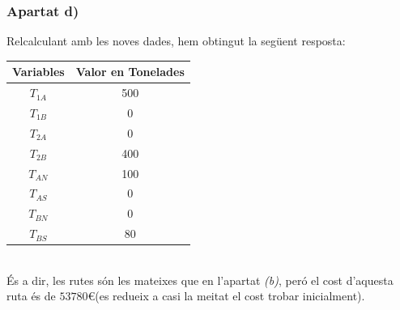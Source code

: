 \documentclass[a4paper, 11pt]{article}
\begin{document}
\subsubsection{Apartat d)}
Relcalculant amb les noves dades, hem obtingut la següent resposta:\\
\begin{table}[h]
    \centering
    \begin{tabular}{ c | c }
        \textbf{Variables} & \textbf{Valor en Tonelades} \\ \hline
        $T_{1A}$ & 500 \\ \hline
        $T_{1B}$ & 0 \\ \hline
        $T_{2A}$ & 0 \\ \hline
        $T_{2B}$ & 400 \\ \hline
        $T_{AN}$ & 100 \\ \hline
        $T_{AS}$ & 0 \\ \hline
        $T_{BN}$ & 0 \\ \hline
        $T_{BS}$ & 80 \\
    \end{tabular}
\end{table}\\
És a dir, les rutes són les mateixes que en l'apartat \textit{(b)}, peró el cost d'aquesta ruta és de $53780$\euro\hspace{0.0625em}(es redueix a casi la meitat el cost trobar inicialment).
\end{document}

